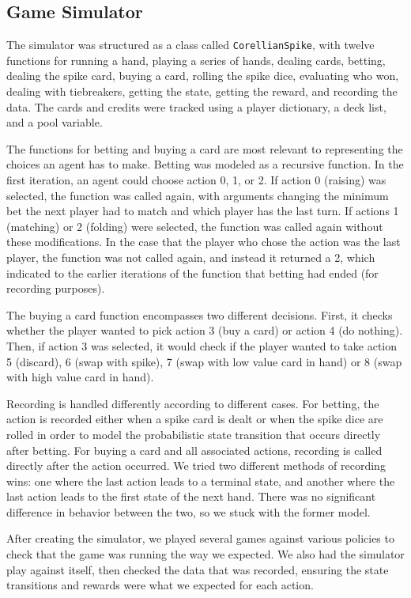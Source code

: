 \documentclass{article}
\begin{document}
\subsection{Game Simulator} %
The simulator was structured as a class called \texttt{CorellianSpike}, with twelve functions for running a hand, playing a series of hands, dealing cards, betting, dealing the spike card, buying a card, rolling the spike dice, evaluating who won, dealing with tiebreakers, getting the state, getting the reward, and recording the data. The cards and credits were tracked using a player dictionary, a deck list, and a pool variable.

The functions for betting and buying a card are most relevant to representing the choices an agent has to make. Betting was modeled as a recursive function. In the first iteration, an agent could choose action 0, 1, or 2. If action 0 (raising) was selected, the function was called again, with arguments changing the minimum bet the next player had to match and which player has the last turn. If actions 1 (matching) or 2 (folding) were selected, the function was called again without these modifications. In the case that the player who chose the action was the last player, the function was not called again, and instead it returned a 2, which indicated to the earlier iterations of the function that betting had ended (for recording purposes).

The buying a card function encompasses two different decisions. First, it checks whether the player wanted to pick action 3 (buy a card) or action 4 (do nothing). Then, if action 3 was selected, it would check if the player wanted to take action 5 (discard), 6 (swap with spike), 7 (swap with low value card in hand) or 8 (swap with high value card in hand).

Recording is handled differently according to different cases. For betting, the action is recorded either when a spike card is dealt or when the spike dice are rolled in order to model the probabilistic state transition that occurs directly after betting. For buying a card and all associated actions, recording is called directly after the action occurred. We tried two different methods of recording wins: one where the last action leads to a terminal state, and another where the last action leads to the first state of the next hand. There was no significant difference in behavior between the two, so we stuck with the former model.

After creating the simulator, we played several games against various policies to check that the game was running the way we expected. We also had the simulator play against itself, then checked the data that was recorded, ensuring the state transitions and rewards were what we expected for each action.
\end{document}
